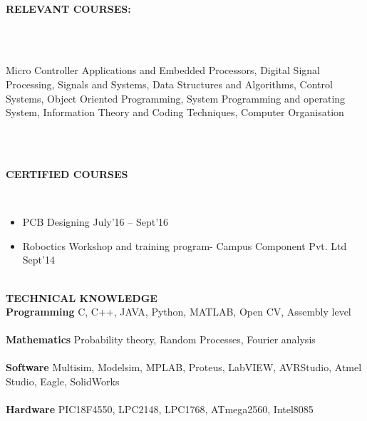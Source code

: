 \documentclass[a4paper,12pt]{report}
\begin{document}
\begin{adjustwidth}{-0.59in}{-0.52in}
\\
\vspace{1cm}
\textbf{RELEVANT COURSES:} 
\end{adjustwidth}
 \\
\begin{adjustwidth}{-0.59in}{0.0in}
\\
Micro Controller Applications and Embedded Processors, Digital Signal Processing, Signals and Systems, Data Structures and Algorithms, Control Systems, Object Oriented Programming, System Programming and operating System, Information Theory and Coding Techniques, Computer Organisation
\end{adjustwidth}
 \\
\vspace{12pt}


\begin{adjustwidth}{-0.59in}{-0.52in}
\\
\vspace{1cm}
\textbf{CERTIFIED COURSES}
\end{adjustwidth}
 \\
\begin{itemize}
\item PCB Designing \hspace*{20pt}  \hspace*{20pt}        \hspace*{20pt}                                                                                            July’16 – Sept’16 \\
\item Roboctics Workshop and training program- Campus Component Pvt. Ltd         \hspace*{20pt}                    Sept’14 \\
\vspace{12pt}
\end{itemize}

\begin{adjustwidth}{-0.59in}{-0.52in}
\\
\vspace{1cm}
\textbf{TECHNICAL KNOWLEDGE}
\\
\textbf{Programming}      \hspace{10pt} C, C++, JAVA, Python, MATLAB, Open CV, Assembly level
 \\
\\
\textbf{Mathematics}       \hspace{10pt} Probability theory, Random Processes, Fourier analysis
 \\
\\
\textbf{Software} \hspace{10pt}      \hspace{10pt} Multisim, Modelsim, MPLAB, Proteus, LabVIEW, AVRStudio, Atmel Studio,  Eagle, \hspace{10pt} SolidWorks
 \\
\\
\textbf{Hardware} \hspace{10pt} PIC18F4550, LPC2148, LPC1768, ATmega2560, Intel8085
\end{adjustwidth}
\end{document}
